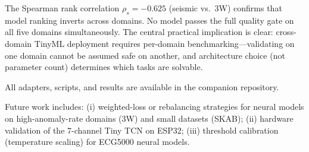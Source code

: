 \documentclass[conference]{IEEEtran}
\begin{document}
The Spearman rank correlation $\rho_s = -0.625$ (seismic vs.\ 3W) confirms
that model ranking inverts across domains.
No model passes the full quality gate on all five domains simultaneously.
The central practical implication is clear: cross-domain TinyML deployment
requires per-domain benchmarking---validating on one domain cannot be assumed
safe on another, and architecture choice (not parameter count) determines
which tasks are solvable.

All adapters, scripts, and results are available in the companion repository.

Future work includes:
(i) weighted-loss or rebalancing strategies for neural models on
    high-anomaly-rate domains (3W) and small datasets (SKAB);
(ii) hardware validation of the 7-channel Tiny TCN on ESP32;
(iii) threshold calibration (temperature scaling) for ECG5000 neural models.

\end{document}
